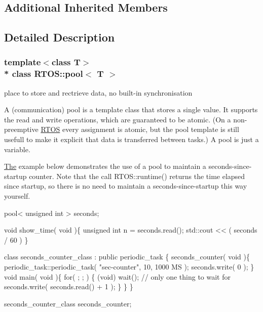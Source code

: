 \subsection*{Additional Inherited Members}


\subsection{Detailed Description}
\subsubsection*{template$<$class T$>$\\*
class R\+T\+O\+S\+::pool$<$ T $>$}

place to store and rectrieve data, no built-\/in synchronisation 

A (communication) pool is a template class that stores a single value. It supports the read and write operations, which are guaranteed to be atomic. (On a non-\/preemptive \hyperlink{class_r_t_o_s}{R\+T\+OS} every assignment is atomic, but the pool template is still usefull to make it explicit that data is transferred between tasks.) A pool is just a variable.

\hyperlink{class_the}{The} example below demonstrates the use of a pool to maintain a seconds-\/since-\/startup counter. Note that the call R\+T\+O\+S\+::runtime() returns the time elapsed since startup, so there is no need to maintain a seconds-\/since-\/startup this way yourself.


\begin{DoxyCode}
pool< unsigned int > seconds;

\textcolor{keywordtype}{void} show\_time( \textcolor{keywordtype}{void} )\{
   \textcolor{keywordtype}{unsigned} \textcolor{keywordtype}{int} n = seconds.read();
   std::cout << ( seconds / 60 ) %
\}

\textcolor{keyword}{class }seconds\_counter\_class : \textcolor{keyword}{public} periodic\_task \{
   seconds\_counter( \textcolor{keywordtype}{void} )\{
      periodic\_task::periodic\_task( \textcolor{stringliteral}{"sec-counter"}, 10, 1000 MS );
      seconds.write( 0 );
   \}
   \textcolor{keywordtype}{void} main( \textcolor{keywordtype}{void} )\{
      \textcolor{keywordflow}{for}( ; ; ) \{
         (void) wait(); \textcolor{comment}{// only one thing to wait for}
         seconds.write( seconds.read() + 1 );
      \}
   \}
\}

seconds\_counter\_class seconds\_counter;
\end{DoxyCode}
 


